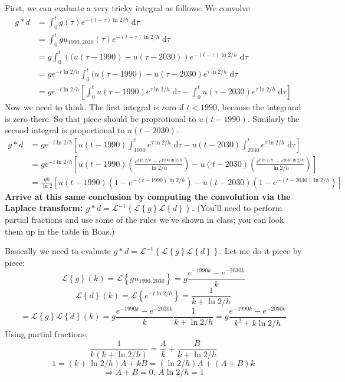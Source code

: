 \documentclass[answers]{exam}\newcommand{\repositoryInformationSetup}{     \usepackage[dvipsnames]{xcolor}     \usepackage[ angle=90, color=black, opacity=1, scale=2, ]{background}      \SetBgPosition{current page.west}      \SetBgVshift{-4.5mm}      \backgroundsetup{contents={{\color{green}\texttt{-{}-} differs from commit \texttt{40a9b87} in 0 files}}} } \newcommand{\commit}{{{\color{green}40a9b87}}}\usepackage{amsmath}
\newcommand{\laplace}[1]{\ensuremath{\mathcal{L}\left\{#1\right\}}\xspace}
\newcommand{\inverselaplace}[1]{\ensuremath{\mathcal{L}\inverse\left\{#1\right\}}\xspace}
\newcommand{\oneover}[1]{\ensuremath{\frac{1}{#1}}}                             \newcommand{\inverse}{\ensuremath{^{-1}}}                                       \providecommand{\half}{\ensuremath{\frac{1}{2}} }                               \renewcommand{\half}{\ensuremath{\frac{1}{2}} }                                 \newcommand{\quarter}{\ensuremath{\frac{1}{4}} }
\providecommand{\id}{}
\renewcommand{\id}[1]{\ensuremath{\; \mathrm{d}#1}}
\begin{document}
\begin{questions}
	First, we can evaluate a very tricky integral as follows:
	We convolve
	\begin{align*}
		g*d
		 & =	\int_{0}^{t} g(\tau) e^{-(t-\tau) \ln 2/h} \id{\tau}
		\\	&=	\int_{0}^{t} g u_{1990,2030}(\tau) e^{-(t-\tau) \ln 2/h} \id{\tau}
		\\	&=	g \int_{0}^{t} \left((u(\tau-1990) - u(\tau-2030)\right) e^{-(t-\tau) \ln 2/h} \id{\tau}
		\\	&=	g e^{-t \ln 2/h} \int_{0}^{t} (u(\tau-1990) - u(\tau-2030) e^{\tau \ln 2/h} \id{\tau}
		\\	&=	g e^{-t \ln 2/h} \left[\int_{0}^{t} u(\tau-1990) e^{\tau \ln 2/h} \id{\tau} - \int_{0}^{t} u(\tau-2030) e^{\tau \ln 2/h} \id{\tau}\right]
	\end{align*}
	Now we need to think.  The first integral is zero if $t<1990$, because the integrand is zero there.  So that piece should be proprotional to $u(t-1990)$.
	Similarly the second integral is proportional to $u(t-2030)$.
	\begin{align*}
		g*d
		 & =	g e^{-t \ln 2/h} \left[ u(t-1990)\int_{1990}^t e^{\tau \ln 2/h} \id{\tau} - u(t-2030)\int_{2030}^{t} e^{\tau \ln 2/h} \id{\tau}\right]
		\\	&=	g e^{-t \ln 2/h} \left[ u(t-1990) \left(\frac{e^{t \ln2/h}-e^{1990 \ln 2/h}}{\ln 2/h}\right) - u(t-2030) \left(\frac{e^{t \ln 2/h} - e^{2030 \ln 2/h}}{\ln 2 / h}\right)\right]
		\\	&=	\frac{gh}{\ln 2} \left[u(t-1990)\left(1-e^{-(t-1990) \ln 2/h} \right)- u(t-2030)\left(1-e^{-(t-2030) \ln 2 / h}\right)\right]
	\end{align*}
	{\bf Arrive at this same conclusion by computing the convolution via the Laplace transform: $g*d = \inverselaplace{\laplace{g} \laplace{d}}$.} (You'll need to perform partial fractions and use some of the rules we've shown in class; you can look them up in the table in Boas.)
	\begin{solution}
		Basically we need to evaluate $g*d = \inverselaplace{\laplace{g} \laplace{d}}$. Let me do it piece by piece:
		$$\laplace{g}(k) = \laplace{gu_{1990,2030}} = g \frac{e^{-1990k} - e^{-2030k}}{k}$$
		$$\laplace{d}(k) = \laplace{e^{-t \ln2/h}} = \oneover{k+\ln2/h}$$
		$$ = \laplace{g} \laplace{d}(k) = g \frac{e^{-1990k} - e^{-2030k}}{k} \oneover{k+\ln2/h} = g \frac{e^{-1990k} - e^{-2030k}}{k^2+k\ln2/h}$$
		Using partial fractions,
		$$  \frac{1}{k (k + \ln2/h)} = \frac{A}{k} + \frac{B}{k + \ln2/h} $$
		$$ 1 = (k + \ln2/h)A + kB = (\ln2/h)A + (A+B)k $$
		$$ \Rightarrow A + B = 0 \textbf{, } A\ln2/h = 1$$

\end{solution}
\end{questions}
\end{document}
